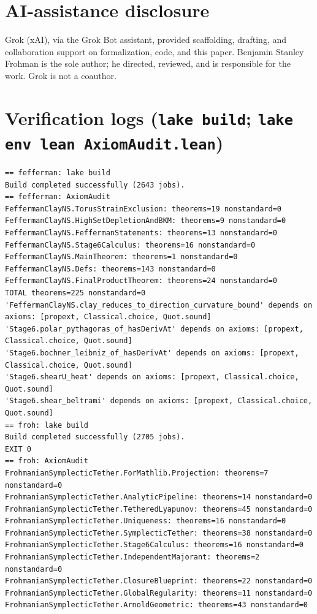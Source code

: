 \documentclass[11pt]{article}
\begin{document}
\section{AI-assistance disclosure}
Grok (xAI), via the Grok Bot assistant, provided scaffolding, drafting, and collaboration support on formalization, code, and this paper. Benjamin Stanley Frohman is the sole author; he directed, reviewed, and is responsible for the work. Grok is not a coauthor.
\appendix\section{Verification logs (\texttt{lake build}; \texttt{lake env lean AxiomAudit.lean})}
\begin{scriptsize}\begin{verbatim}
== fefferman: lake build
Build completed successfully (2643 jobs).
== fefferman: AxiomAudit
FeffermanClayNS.TorusStrainExclusion: theorems=19 nonstandard=0
FeffermanClayNS.HighSetDepletionAndBKM: theorems=9 nonstandard=0
FeffermanClayNS.FeffermanStatements: theorems=13 nonstandard=0
FeffermanClayNS.Stage6Calculus: theorems=16 nonstandard=0
FeffermanClayNS.MainTheorem: theorems=1 nonstandard=0
FeffermanClayNS.Defs: theorems=143 nonstandard=0
FeffermanClayNS.FinalProductTheorem: theorems=24 nonstandard=0
TOTAL theorems=225 nonstandard=0
'FeffermanClayNS.clay_reduces_to_direction_curvature_bound' depends on axioms: [propext, Classical.choice, Quot.sound]
'Stage6.polar_pythagoras_of_hasDerivAt' depends on axioms: [propext, Classical.choice, Quot.sound]
'Stage6.bochner_leibniz_of_hasDerivAt' depends on axioms: [propext, Classical.choice, Quot.sound]
'Stage6.shearU_heat' depends on axioms: [propext, Classical.choice, Quot.sound]
'Stage6.shear_beltrami' depends on axioms: [propext, Classical.choice, Quot.sound]
== froh: lake build
Build completed successfully (2705 jobs).
EXIT 0
== froh: AxiomAudit
FrohmanianSymplecticTether.ForMathlib.Projection: theorems=7 nonstandard=0
FrohmanianSymplecticTether.AnalyticPipeline: theorems=14 nonstandard=0
FrohmanianSymplecticTether.TetheredLyapunov: theorems=45 nonstandard=0
FrohmanianSymplecticTether.Uniqueness: theorems=16 nonstandard=0
FrohmanianSymplecticTether.SymplecticTether: theorems=38 nonstandard=0
FrohmanianSymplecticTether.Stage6Calculus: theorems=16 nonstandard=0
FrohmanianSymplecticTether.IndependentMajorant: theorems=2 nonstandard=0
FrohmanianSymplecticTether.ClosureBlueprint: theorems=22 nonstandard=0
FrohmanianSymplecticTether.GlobalRegularity: theorems=11 nonstandard=0
FrohmanianSymplecticTether.ArnoldGeometric: theorems=43 nonstandard=0

\end{verbatim}
\end{scriptsize}
\end{document}
